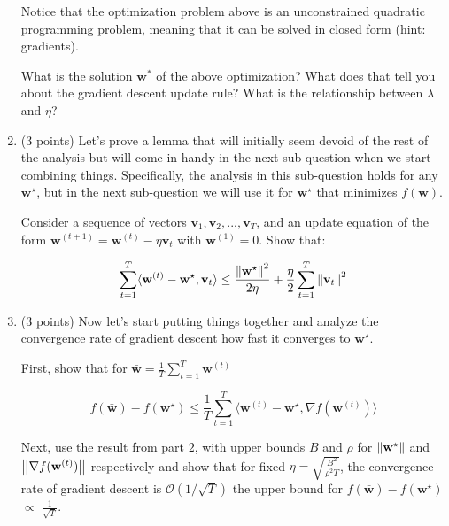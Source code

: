 \documentclass[11pt,english]{article}
\begin{document}
\begin{enumerate}[start]
Notice that the optimization problem above is an unconstrained quadratic programming problem,
meaning that it can be solved in closed form (hint: gradients).

What is the solution $\mathbf{w}^*$ of the above optimization?
What does that tell you about the gradient descent update rule?
What is the relationship between $\lambda$ and $\eta$?

\item (3 points) Let's prove a lemma that will initially seem devoid of the rest of the analysis but will come 
in handy in the next sub-question when we start combining things. 
Specifically, the analysis in this sub-question holds for any $\mathbf{w}^{\star}$, but in the next sub-question  
we will use it for $\mathbf{w}^{\star}$ that minimizes $f(\mathbf{w})$. 

Consider a sequence of vectors $\mathbf{v}_1, \mathbf{v}_2, ..., \mathbf{v}_T$, 
and an update equation of the form $\mathbf{w}^{(t+1)} = \mathbf{w}^{(t)} - \eta\mathbf{v}_{t}$ 
with $\mathbf{w}^{(1)} = 0$. 
Show that: 

\begin{equation}
\sum_{t=1}^T \langle \mathbf{w}^{(t)}-\mathbf{w}^{\star}, \mathbf{v}_t \rangle \leq
\frac{\left| \hspace{-0.7pt}\left|\mathbf{w}^{\star}\right| \hspace{-0.7pt}\right|^2}{2\eta} + \frac{\eta}{2} \sum_{t=1}^T \left| \hspace{-0.7pt}\left|\mathbf{v}_t\right| \hspace{-0.7pt}\right|^2
\end{equation}

\item (3 points) Now let's start putting things together and analyze the convergence rate of gradient descent \ie
how fast it converges to $\mathbf{w}^\star$.


First, show that for $\mathbf{\bar w} = \frac{1}{T} \sum_{t=1}^T \mathbf{w}^{(t)}$

\begin{equation}
f(\mathbf{\bar w}) - f(\mathbf{w}^\star) \leq \frac{1}{T} \sum_{t=1}^T
\langle \mathbf{w}^{(t)}-\mathbf{w}^{\star}, \nabla f(\mathbf{w}^{(t)}) \rangle
\end{equation}

Next, use the result from part $2$, with upper bounds $B$ and $\rho$ for
$\left| \hspace{-0.7pt}\left|\mathbf{w}^\star\right| \hspace{-0.7pt}\right|$ and $\left| \hspace{-0.7pt}\left|\nabla f(\mathbf{w}^{(t)})\right| \hspace{-0.7pt}\right|$
respectively and show that for fixed $\eta = \sqrt{\frac{B^2}{\rho^2T}}$,
the convergence rate of gradient descent is $\mathcal{O}(1/\sqrt{T})$
\ie the upper bound for $f(\mathbf{\bar w}) - f(\mathbf{w}^\star)$
$\propto$ $\frac{1}{\sqrt{T}}$.


\end{enumerate}
\end{document}
